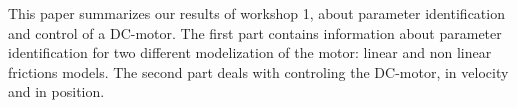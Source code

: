 This paper summarizes our results of workshop 1, about  parameter identification and control of a DC-motor. The first part contains information about parameter identification for two different modelization of the motor: linear and non linear frictions models. The second part deals with controling the DC-motor, in velocity and in position. 